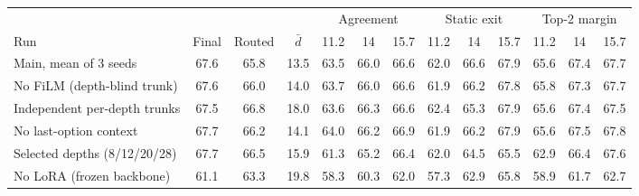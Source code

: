 \begin{tabular}{lccc|ccc|ccc|ccc}
\toprule
& & & & \multicolumn{3}{c|}{Agreement} & \multicolumn{3}{c|}{Static exit} & \multicolumn{3}{c}{Top-2 margin} \\
Run & Final & Routed & $\bar d$ & 11.2 & 14 & 15.7 & 11.2 & 14 & 15.7 & 11.2 & 14 & 15.7 \\
\midrule
Main, mean of 3 seeds & 67.6 & 65.8 & 13.5 & 63.5 & 66.0 & 66.6 & 62.0 & 66.6 & 67.9 & 65.6 & 67.4 & 67.7 \\
No FiLM (depth-blind trunk) & 67.6 & 66.0 & 14.0 & 63.7 & 66.0 & 66.6 & 61.9 & 66.2 & 67.8 & 65.8 & 67.3 & 67.7 \\
Independent per-depth trunks & 67.5 & 66.8 & 18.0 & 63.6 & 66.3 & 66.6 & 62.4 & 65.3 & 67.9 & 65.6 & 67.4 & 67.5 \\
No last-option context & 67.7 & 66.2 & 14.1 & 64.0 & 66.2 & 66.9 & 61.9 & 66.2 & 67.9 & 65.6 & 67.5 & 67.8 \\
Selected depths (8/12/20/28) & 67.7 & 66.5 & 15.9 & 61.3 & 65.2 & 66.4 & 62.0 & 64.5 & 65.5 & 62.9 & 66.4 & 67.6 \\
No LoRA (frozen backbone) & 61.1 & 63.3 & 19.8 & 58.3 & 60.3 & 62.0 & 57.3 & 62.9 & 65.8 & 58.9 & 61.7 & 62.7 \\
\bottomrule
\end{tabular}
